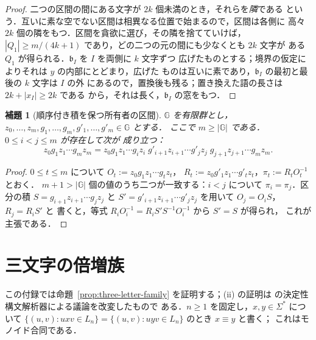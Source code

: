 \documentclass[11pt,a4paper]{ltjsarticle}
\numberwithin{equation}{section}
\theoremstyle{plain}
\newtheorem{lemma}[theorem]{補題}
\theoremstyle{definition}
\theoremstyle{remark}
\theoremstyle{plain}
\begin{document}
\begin{proof}
二つの区間の間にある文字が $2k$ 個未満のとき，それらを\emph{隣}である
という．互いに素な空でない区間は相異なる位置で始まるので，区間は各側に
高々 $2k$ 個の隣をもつ．区間を貪欲に選び，その隣を捨てていけば，
$|Q_1|\ge m/(4k+1)$ であり，どの二つの元の間にも少なくとも $2k$ 文字が
ある $Q_1$ が得られる．$\mathfrak b_I$ を $I$ を両側に $k$ 文字ずつ
広げたものとする；境界の仮定によりそれは $y$ の内部にとどまり，広げた
ものは互いに素であり，$\mathfrak b_I$ の最初と最後の $k$ 文字は $I$ の外
にあるので，置換後も残る；置き換えた語の長さは $2k+|x_I|\ge2k$ である
から，それは長く，$\mathfrak b_I$ の窓をもつ．
\end{proof}

\begin{lemma}[順序付き積を保つ所有者の区間]
\label{lem:group-interval}
$\mathbb G$ を有限群とし，
$z_0,\ldots,z_m,g_1,\ldots,g_m,g'_1,\ldots,g'_m\in\mathbb G$ とする．
ここで $m\ge|\mathbb G|$ である．$0\le i<j\le m$ が存在して次が
成り立つ：
\[
 z_0g_1z_1\cdots g_mz_m=
 z_0g_1z_1\cdots g_iz_i\;g'_{i+1}z_{i+1}\cdots g'_jz_j\;g_{j+1}z_{j+1}\cdots g_mz_m .
\]
\end{lemma}

\begin{proof}
$0\le t\le m$ について $O_t:=z_0g_1z_1\cdots g_tz_t$，
$R_t:=z_0g'_1z_1\cdots g'_tz_t$，$\pi_t:=R_tO_t^{-1}$ とおく．
$m+1>|\mathbb G|$ 個の値のうち二つが一致する：$i<j$ について
$\pi_i=\pi_j$．区分の積 $S=g_{i+1}z_{i+1}\cdots g_jz_j$ と
$S'=g'_{i+1}z_{i+1}\cdots g'_jz_j$ を用いて $O_j=O_iS$，$R_j=R_iS'$ と
書くと，等式 $R_iO_i^{-1}=R_iS'S^{-1}O_i^{-1}$ から $S'=S$ が得られ，
これが主張である．
\end{proof}

\section{三文字の倍増族}
\label{app:three-letter}
この付録では命題~\ref{prop:three-letter-family} を証明する；(ii) の証明は
\cite[付録~C]{kuriyamaCFG} の決定性構文解析器による議論を改変したもので
ある．$n\ge1$ を固定し，$x,y\in\Sigma^*$ について
$\{(u,v):uxv\in L_n\}=\{(u,v):uyv\in L_n\}$ のとき $x\equiv y$ と書く；
これはモノイド合同である．
\end{document}
